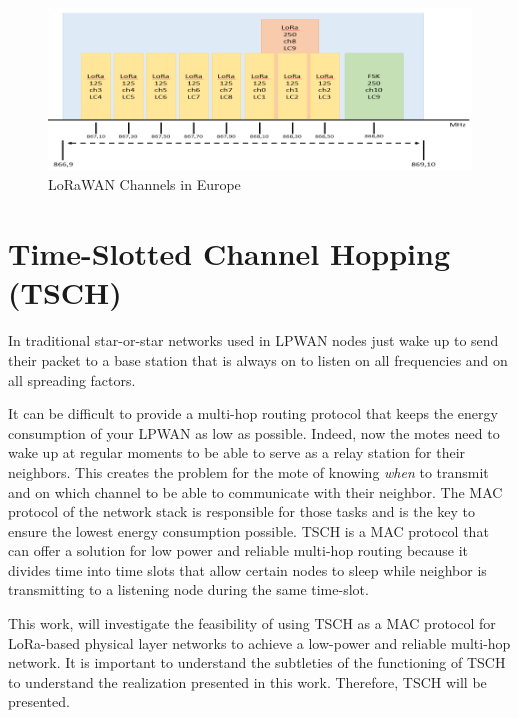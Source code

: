 \begin{figure}[H]
  \centering
  \includegraphics[width=\textwidth]{thesis.tex/chapters/context/fig/channels.png}
  \caption{LoRaWAN Channels in Europe\cite{Polonelli_2019}\label{fig:channels}}
\end{figure}


\section{Time-Slotted Channel Hopping (TSCH)}

In traditional star-or-star networks used in LPWAN nodes just wake up
to send their packet to a base station that is always on to listen on all
frequencies and on all spreading factors.

It can be difficult to provide a multi-hop routing protocol that keeps the energy
consumption of your LPWAN as low as possible.
Indeed, now the motes need to wake up at regular moments to be able to serve
as a relay station for their neighbors.
This creates the problem for the mote of knowing \emph{when} to transmit
and on which channel to be able to communicate with their neighbor.
The MAC protocol of the network stack is responsible for those tasks and
is the key to ensure the lowest energy consumption possible.
TSCH is a MAC protocol that can offer a solution for low power and reliable multi-hop routing
because it divides time into time slots that allow certain nodes to sleep while
neighbor is transmitting to a listening node during the same time-slot.

This work, will investigate the feasibility of using TSCH as a MAC protocol for
LoRa-based physical layer networks to achieve a low-power and reliable
multi-hop network.
It is important to understand the subtleties of the functioning of TSCH to
understand the realization presented in this work.
Therefore, TSCH will be presented.

